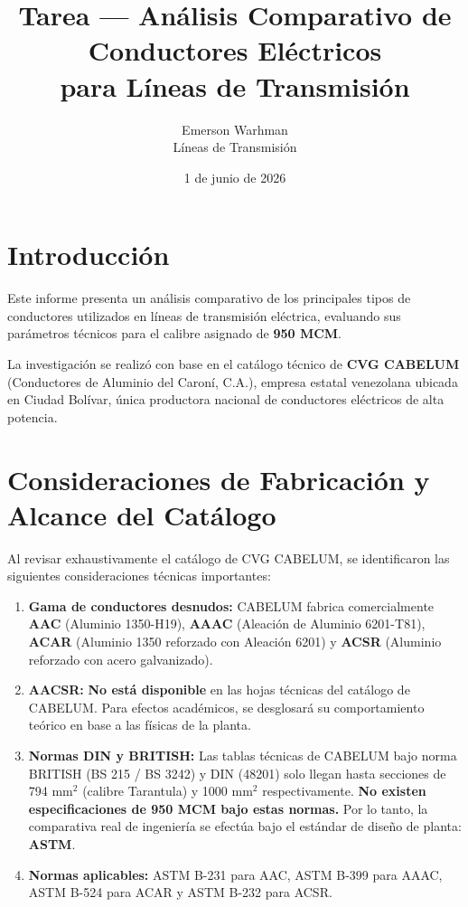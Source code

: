 \documentclass[12pt,a4paper]{article}
\title{Tarea --- Análisis Comparativo de Conductores Eléctricos\\para Líneas de Transmisión}
\author{Emerson Warhman\\Líneas de Transmisión}
\date{1 de junio de 2026}
\begin{document}
\maketitle

\section{Introducción}

Este informe presenta un análisis comparativo de los principales tipos de
conductores utilizados en líneas de transmisión eléctrica, evaluando sus
parámetros técnicos para el calibre asignado de \textbf{950 MCM}.

La investigación se realizó con base en el catálogo técnico de \textbf{CVG CABELUM}
(Conductores de Aluminio del Caroní, C.A.), empresa estatal venezolana ubicada
en Ciudad Bolívar, única productora nacional de conductores eléctricos de alta
potencia.

\section{Consideraciones de Fabricación y Alcance del Catálogo}

Al revisar exhaustivamente el catálogo de CVG CABELUM, se identificaron las
siguientes consideraciones técnicas importantes:

\begin{enumerate}
    \item \textbf{Gama de conductores desnudos:} CABELUM fabrica comercialmente
        \textbf{AAC} (Aluminio 1350-H19), \textbf{AAAC} (Aleación de Aluminio
        6201-T81), \textbf{ACAR} (Aluminio 1350 reforzado con Aleación 6201) y
        \textbf{ACSR} (Aluminio reforzado con acero galvanizado).

    \item \textbf{AACSR:} \textbf{No está disponible} en las hojas técnicas del
        catálogo de CABELUM. Para efectos académicos, se desglosará su
        comportamiento teórico en base a las físicas de la planta.

    \item \textbf{Normas DIN y BRITISH:} Las tablas técnicas de CABELUM bajo
        norma BRITISH (BS 215 / BS 3242) y DIN (48201) solo llegan hasta
        secciones de 794 mm$^2$ (calibre Tarantula) y 1000 mm$^2$
        respectivamente. \textbf{No existen especificaciones de 950 MCM bajo
        estas normas.} Por lo tanto, la comparativa real de ingeniería se
        efectúa bajo el estándar de diseño de planta: \textbf{ASTM}.

    \item \textbf{Normas aplicables:} ASTM B-231 para AAC, ASTM B-399 para
        AAAC, ASTM B-524 para ACAR y ASTM B-232 para ACSR.
\end{enumerate}
\end{document}
